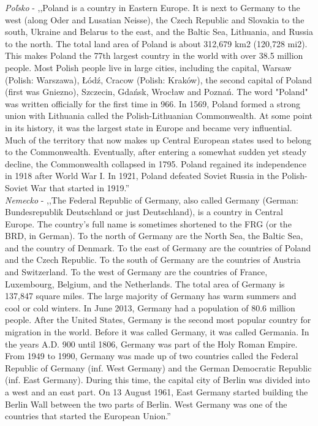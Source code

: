 \noindent
\textit{Poľsko} - ,,Poland is a country in Eastern Europe. It is next to Germany to the west (along Oder and Lusatian Neisse), the Czech Republic and Slovakia to the south, Ukraine and Belarus to the east, and the Baltic Sea, Lithuania, and Russia to the north. The total land area of Poland is about 312,679 km2 (120,728 mi2). This makes Poland the 77th largest country in the world with over 38.5 million people. Most Polish people live in large cities, including the capital, Warsaw (Polish: Warszawa), Łódź, Cracow (Polish: Kraków), the second capital of Poland (first was Gniezno), Szczecin, Gdańsk, Wrocław and Poznań. The word "Poland" was written officially for the first time in 966. In 1569, Poland formed a strong union with Lithuania called the Polish-Lithuanian Commonwealth. At some point in its history, it was the largest state in Europe and became very influential. Much of the territory that now makes up Central European states used to belong to the Commonwealth. Eventually, after entering a somewhat sudden yet steady decline, the Commonwealth collapsed in 1795. Poland regained its independence in 1918 after World War I. In 1921, Poland defeated Soviet Russia in the Polish-Soviet War that started in 1919.'' \\

\noindent
\textit{Nemecko} - ,,The Federal Republic of Germany, also called Germany (German: Bundesrepublik Deutschland or just Deutschland), is a country in Central Europe. The country's full name is sometimes shortened to the FRG (or the BRD, in German). To the north of Germany are the North Sea, the Baltic Sea, and the country of Denmark. To the east of Germany are the countries of Poland and the Czech Republic. To the south of Germany are the countries of Austria and Switzerland. To the west of Germany are the countries of France, Luxembourg, Belgium, and the Netherlands. The total area of Germany is 137,847 square miles. The large majority of Germany has warm summers and cool or cold winters. In June 2013, Germany had a population of 80.6 million people. After the United States, Germany is the second most popular country for migration in the world. Before it was called Germany, it was called Germania. In the years A.D. 900 until 1806, Germany was part of the Holy Roman Empire. From 1949 to 1990, Germany was made up of two countries called the Federal Republic of Germany (inf. West Germany) and the German Democratic Republic (inf. East Germany). During this time, the capital city of Berlin was divided into a west and an east part. On 13 August 1961, East Germany started building the Berlin Wall between the two parts of Berlin. West Germany was one of the countries that started the European Union.'' \\


